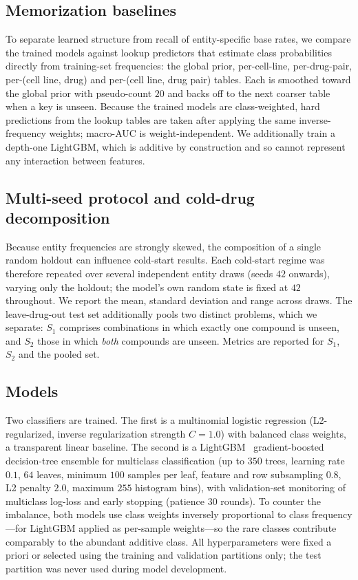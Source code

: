 \documentclass{bmcart}
\begin{document}
\subsection*{Memorization baselines}
To separate learned structure from recall of entity-specific base rates, we compare the trained models
against lookup predictors that estimate class probabilities directly from training-set frequencies:
the global prior, per-cell-line, per-drug-pair, per-(cell line, drug) and per-(cell line, drug pair)
tables. Each is smoothed toward the global prior with pseudo-count $20$ and backs off to the next
coarser table when a key is unseen. Because the trained models are class-weighted, hard predictions
from the lookup tables are taken after applying the same inverse-frequency weights; macro-AUC is
weight-independent. We additionally train a depth-one LightGBM, which is additive by construction and
so cannot represent any interaction between features.

\subsection*{Multi-seed protocol and cold-drug decomposition}
Because entity frequencies are strongly skewed, the composition of a single random holdout can
influence cold-start results. Each cold-start regime was therefore repeated over several independent
entity draws (seeds $42$ onwards), varying only the holdout; the model's own random state is fixed at
$42$ throughout. We report the mean, standard deviation and range across draws. The leave-drug-out test
set additionally pools two distinct problems, which we separate: $S_1$ comprises combinations in which
exactly one compound is unseen, and $S_2$ those in which \emph{both} compounds are unseen. Metrics are
reported for $S_1$, $S_2$ and the pooled set.

\subsection*{Models}
Two classifiers are trained. The first is a multinomial logistic regression (L2-regularized, inverse
regularization strength $C=1.0$) with balanced class weights, a transparent linear baseline. The second
is a LightGBM~\cite{ke2017} gradient-boosted decision-tree ensemble for multiclass classification (up
to $350$ trees, learning rate $0.1$, $64$ leaves, minimum $100$ samples per leaf, feature and row
subsampling $0.8$, L2 penalty $2.0$, maximum $255$ histogram bins), with validation-set monitoring of
multiclass log-loss and early stopping (patience $30$ rounds). To counter the imbalance, both models
use class weights inversely proportional to class frequency---for LightGBM applied as per-sample
weights---so the rare classes contribute comparably to the abundant additive class. All hyperparameters
were fixed a priori or selected using the training and validation partitions only; the test partition
was never used during model development.
\end{document}

